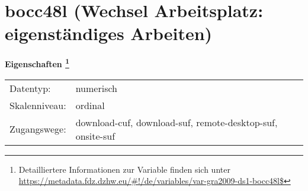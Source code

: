 
    \setcounter{footnote}{0}

    \vspace*{-1.8cm}
	\section{bocc48l (Wechsel Arbeitsplatz: eigenständiges Arbeiten)}
	\label{section:bocc48l}



    \vspace*{0.5cm}
    \noindent\textbf{Eigenschaften
	\footnote{Detailliertere Informationen zur Variable finden sich unter
		\url{https://metadata.fdz.dzhw.eu/\#!/de/variables/var-gra2009-ds1-bocc48l$}}}\\
	\begin{tabularx}{\hsize}{@{}lX}
	Datentyp: & numerisch \\
	Skalenniveau: & ordinal \\
	Zugangswege: &
	  download-cuf, 
	  download-suf, 
	  remote-desktop-suf, 
	  onsite-suf
 \\
    \end{tabularx}



